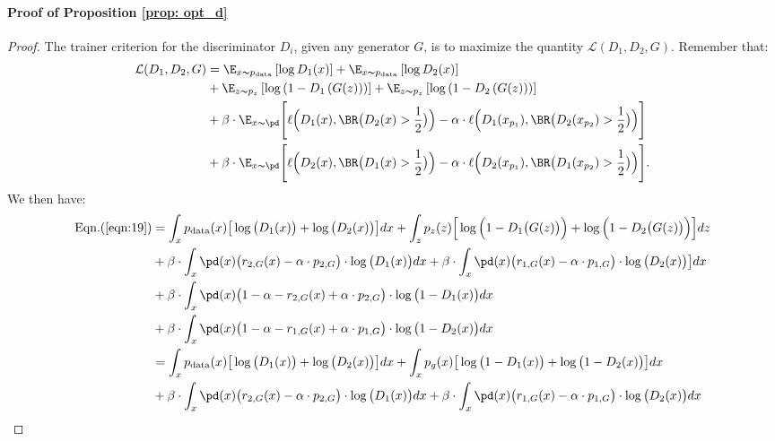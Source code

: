 \paragraph{\textbf{Proof of Proposition \ref{prop: opt_d}}}
\begin{proof}
The trainer criterion for the discriminator $D_i$, given any generator $G$, is to maximize the quantity $\mathcal{L}(D_1, D_2,G)$. Remember that:
\begin{align}\label{eqn:19}
    \mathcal{L}(D_1, D_2, G)
    &= \E_{x\thicksim p_{\text{data}}}\left[\log D_1(x)\right]+\E_{x\thicksim p_{\text{data}}}\left[\log D_2(x)\right]\notag\\
    &+\E_{z\thicksim p_{z}}\left[\log \left(1-D_1\left(G(z)\right)\right)\right]+\E_{z\thicksim p_{z}}\left[\log \left(1-D_2\left(G(z)\right)\right)\right]\notag\\
    &+\beta \cdot \E_{x\thicksim \pd}\Bigg[\ell\Big(D_1(x),\BR\big(D_2(x)>\dfrac{1}{2}\big)\Big)-\alpha \cdot \ell\Big(D_1(x_{p_1}),\BR\big(D_2(x_{p_2})>\dfrac{1}{2}\big)\Big)\Bigg]\notag\\
     &+\beta \cdot \E_{x\thicksim \pd}\Bigg[\ell\Big(D_2(x),\BR\big(D_1(x)>\dfrac{1}{2}\big)\Big)-\alpha \cdot \ell\Big(D_2(x_{p_1}),\BR\big(D_1(x_{p_2})>\dfrac{1}{2}\big)\Big)\Bigg].
\end{align}
We then have:
{
\begin{align}
    \begin{split}
    \text{Eqn.}(\ref{eqn:19})&= \int_{x}p_{\text{data}}(x)\big[\log\big(D_1(x)\big)+\log\big(D_2(x)\big)\big]dx+\int_{z}p_{z}(z)\Big[\log\Big(1-D_1\big(G(z)\big)\Big)+\log\Big(1-D_2\big(G(z)\big)\Big)\Big]dz\\
    &+\beta \cdot \int_{x} \pd(x)\big(r_{2,G}(x)-\alpha \cdot p_{2,G}\big)\cdot \log\big(D_1(x)\big)dx+\beta \cdot \int_{x} \pd(x)\big(r_{1,G}(x)-\alpha \cdot p_{1,G}\big)\cdot \log\big(D_2(x)\big)\big]dx\\
    &+\beta\cdot \int_{x} \pd(x)\big(1-\alpha-r_{2,G}(x)+\alpha \cdot p_{2,G}\big)\cdot \log\big(1-D_1(x)\big)dx\\
    &+\beta \cdot \int_{x} \pd(x)\big(1-\alpha-r_{1,G}(x)+\alpha \cdot p_{1,G}\big)\cdot \log\big(1-D_2(x)\big)dx\\
    &= \int_{x}p_{\text{data}}(x)\big[\log\big(D_1(x)\big)+\log\big(D_2(x)\big)\big]dx+\int_{x}p_{g}(x)\big[\log\big(1-D_1(x)\big)+\log\big(1-D_2(x)\big)\big]dx\\
    &+\beta \cdot \int_{x} \pd(x)\big(r_{2,G}(x)-\alpha \cdot p_{2,G}\big)\cdot \log\big(D_1(x)\big)dx+\beta \cdot \int_{x} \pd(x)\big(r_{1,G}(x)-\alpha \cdot p_{1,G}\big)\cdot \log\big(D_2(x)\big)dx\\

\end{split}
\end{align}}
\end{proof}
